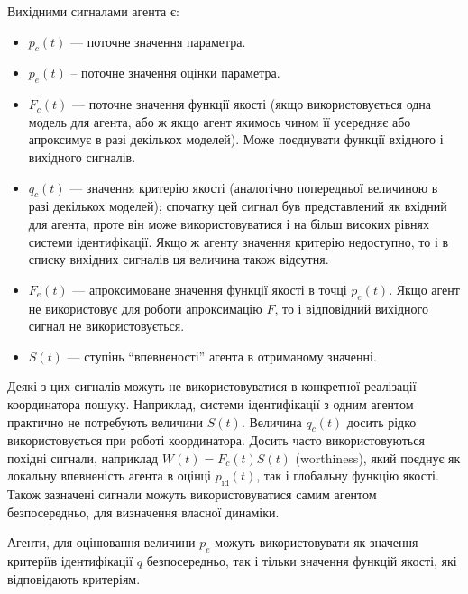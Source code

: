 Вихідними сигналами агента є:\label{atu:d:agent_out_list}

\begin{itemize}

  \item
    $p_c(t)$ ---
    поточне значення параметра.

  \item
    $p_e(t)$\label{atu:d:p_e} --
    поточне значення оцінки параметра.

  \item
    $F_c(t)$ ---
    поточне значення функції якості (якщо використовується одна
    модель для агента, або ж якщо агент якимось чином її усередняє
    або апроксимує в разі декількох моделей). Може поєднувати
    функції вхідного і вихідного сигналів.

  \item
    $q_c(t)$ ---
    значення критерію якості (аналогічно попередньої величиною в
    разі декількох моделей); спочатку цей сигнал був представлений
    як вхідний для агента, проте він може використовуватися і
    на більш високих рівнях системи ідентифікації. Якщо ж агенту
    значення критерію недоступно, то і в списку вихідних сигналів
    ця величина також відсутня.

  \item
    $F_e(t)$ ---
    апроксимоване значення функції якості в точці
    $p_e(t)$. Якщо агент не використовує для роботи апроксимацію
    $ F $, то і відповідний вихідного сигнал не використовується.

  \item
    $S(t)$ ---
    ступінь ``впевненості'' агента в отриманому значенні.

\end{itemize}

Деякі з цих сигналів можуть не використовуватися в конкретної
реалізації координатора пошуку. Наприклад, системи
ідентифікації з одним агентом практично не потребують величини
$S(t)$. Величина
$q_c(t) $ досить рідко використовується при роботі
координатора. Досить часто використовуються похідні сигнали,
наприклад
$ W(t) = F_c(t) S(t) $ (worthiness), який поєднує як локальну впевненість
агента в оцінці
$ p_\mathrm{id} (t) $, так і глобальну функцію якості. Також зазначені
сигнали можуть використовуватися самим агентом безпосередньо,
для визначення власної динаміки.


Агенти, для оцінювання величини $p_e$ можуть використовувати як значення
критеріїв ідентифікації $q$ безпосередньо, так і тільки значення функцій
якості, які відповідають критеріям.

